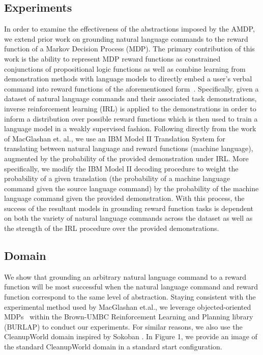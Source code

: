 \documentclass[conference]{IEEEtran}
\begin{document}
\subsection{Experiments}

In order to examine the effectiveness of the abstractions imposed by the AMDP, we extend prior work on grounding natural language commands to the reward function of a Markov Decision Process (MDP). The primary contribution of this work is the ability to represent MDP reward functions as constrained conjunctions of propositional logic functions as well as combine learning from demonstration methods with language models to directly embed a user's verbal command into reward functions of the aforementioned form~\cite{MacGlashan2015GroundingEC}. Specifically, given a dataset of natural language commands and their associated task demonstrations, inverse reinforcement learning (IRL) is applied to the demonstrations in order to inform a distribution over possible reward functions which is then used to train a language model in a weakly supervised fashion. Following directly from the work of MacGlashan et. al., we use an IBM Model II Translation System for translating between natural language and reward functions (machine language), augmented by the probability of the provided demonstration under IRL. More specifically, we modify the IBM Model II decoding procedure to weight the probability of a given translation (the probability of a machine language command given the source language command) by the probability of the machine language command given the provided demonstration. With this process, the success of the resultant models in grounding reward function tasks is dependent on both the variety of natural language commands across the dataset as well as the strength of the IRL procedure over the provided demonstrations.

\subsection{Domain}

We show that grounding an arbitrary natural language command to a reward function will be most successful when the natural language command and reward function correspond to the same level of abstraction. Staying consistent with the experimental method used by MacGlashan et.al., we leverage objected-oriented MDPs~\cite{Diuk2008AnOR} within the Brown-UMBC Reinforcement Learning and Planning library (BURLAP) to conduct our experiments. For similar reasons, we also use the CleanupWorld domain inspired by Sokoban \cite{Junghanns2001SokobanEG}. In Figure 1, we provide an image of the standard CleanupWorld domain in a standard start configuration.
\end{document}
